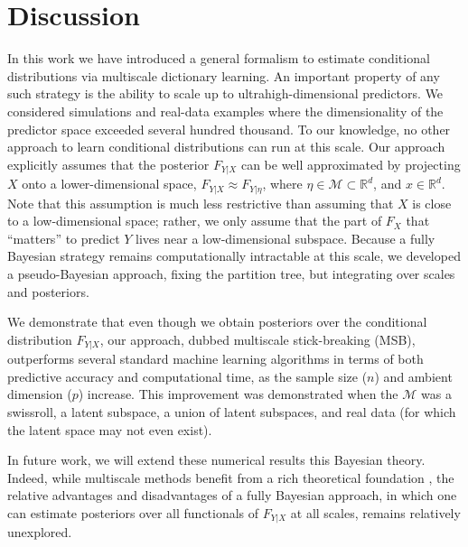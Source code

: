 \documentclass{article} %
\newcommand{\Real}{\mathbb{R}}
\providecommand{\mc}[1]{\mathcal{#1}}
\begin{document}
\section{Discussion} \label{sec:disc}

In this work we have introduced a general formalism to estimate conditional distributions via  multiscale dictionary learning.  An important property of any such strategy is the ability to scale up to ultrahigh-dimensional predictors.  We considered simulations and real-data examples where the dimensionality of the predictor space exceeded several hundred thousand.  To our knowledge, no other approach to learn conditional distributions can run at this scale.  Our approach explicitly assumes that the posterior $F_{Y|X}$ can be well approximated by projecting $X$ onto a lower-dimensional space, $F_{Y|X} \approx F_{Y|\eta}$, where $\eta \in \mc{M} \subset \Real^d$, and $x \in \Real^d$.   Note that this assumption is much less restrictive than assuming that $X$ is close to a low-dimensional space; rather, we only assume that the part of $F_X$ that ``matters'' to predict $Y$ lives near a low-dimensional subspace.  Because a fully Bayesian strategy remains computationally intractable at this scale, we developed a pseudo-Bayesian approach, fixing the partition tree, but integrating over scales and posteriors.

We demonstrate that even though we obtain posteriors over the conditional distribution $F_{Y|X}$, our approach, dubbed multiscale stick-breaking (MSB), outperforms several standard machine learning algorithms in terms of both predictive accuracy and computational time, as the sample size ($n$) and ambient dimension ($p$) increase.  This improvement was demonstrated when the $\mc{M}$ was a swissroll, a latent subspace, a union of latent subspaces, and real data (for which the latent space may not even exist).    

In future work, we will extend these numerical results this Bayesian theory.  Indeed, while multiscale methods benefit from a rich theoretical foundation \cite{Allard2012}, the relative advantages and disadvantages of a fully Bayesian approach, in which one can estimate posteriors over all functionals of $F_{Y|X}$ at all scales, remains relatively unexplored.  

 
 
\end{document}
